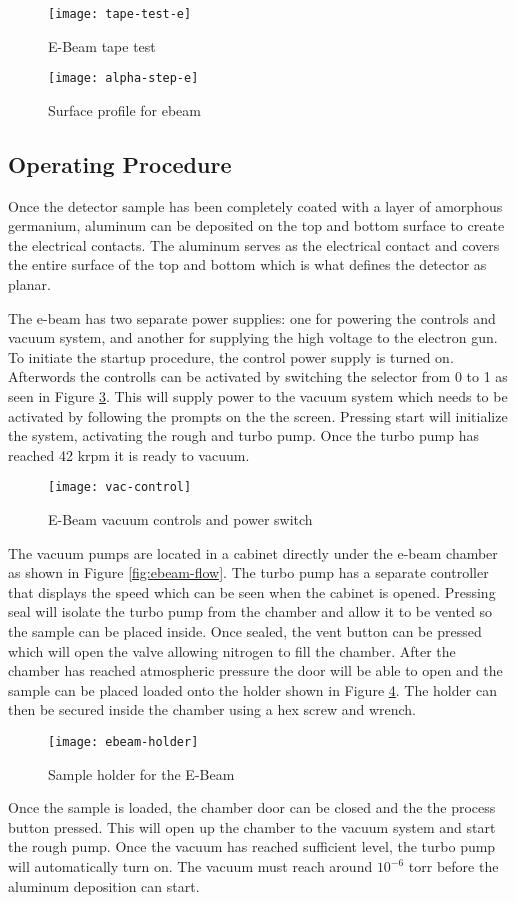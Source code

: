 \begin{figure}[htpb]
\centering
\texttt{[image: tape-test-e]}
\caption{E-Beam tape test}
\label{fig:tape-test-e}
\end{figure}

\begin{figure}[htpb]
\centering
\texttt{[image: alpha-step-e]}
\caption{Surface profile for ebeam}
\label{fig:alpha-step-e}
\end{figure}

\subsection{Operating Procedure}
Once the detector sample has been completely coated with a layer of amorphous germanium, aluminum can be deposited on the top and bottom surface to create the electrical contacts.
The aluminum serves as the electrical contact and covers the entire surface of the top and bottom which is what defines the detector as planar.

The e-beam has two separate power supplies: one for powering the controls and vacuum system, and another for supplying the high voltage to the electron gun.
To initiate the startup procedure, the control power supply is turned on.
Afterwords the controlls can be activated by switching the selector from 0 to 1 as seen in Figure \ref{fig:vac-control}.
This will supply power to the vacuum system which needs to be activated by following the prompts on the the screen.
Pressing start will initialize the system, activating the rough and turbo pump.
Once the turbo pump has reached 42 krpm it is ready to vacuum.
\begin{figure}[htpb]
\centering
\texttt{[image: vac-control]}
\caption{E-Beam vacuum controls and power switch}
\label{fig:vac-control}
\end{figure}

The vacuum pumps are located in a cabinet directly under the e-beam chamber as shown in Figure \ref{fig:ebeam-flow}.
The turbo pump has a separate controller that displays the speed which can be seen when the cabinet is opened.
Pressing seal will isolate the turbo pump from the chamber and allow it to be vented so the sample can be placed inside.
Once sealed, the vent button can be pressed which will open the valve allowing nitrogen to fill the chamber.
After the chamber has reached atmospheric pressure the door will be able to open and the sample can be placed loaded onto the holder shown in Figure \ref{fig:ebeam-holder}.
The holder can then be secured inside the chamber using a hex screw and wrench.
\begin{figure}[htpb]
\centering
\texttt{[image: ebeam-holder]}
\caption{Sample holder for the E-Beam}
\label{fig:ebeam-holder}
\end{figure}
Once the sample is loaded, the chamber door can be closed and the the process button pressed.
This will open up the chamber to the vacuum system and start the rough pump.
Once the vacuum has reached sufficient level, the turbo pump will automatically turn on.
The vacuum must reach around $10^{-6}$ torr before the aluminum deposition can start.

